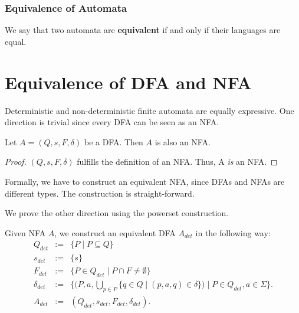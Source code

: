 

%


\subsubsection{Equivalence of Automata}
\begin{definition}
    We say that two automata are \textbf{equivalent} if and only if their languages are equal.
\end{definition}

\section{Equivalence of DFA and NFA}
 
Deterministic and non-deterministic finite automata are equally expressive. 
One direction is trivial since every DFA can be seen as an NFA. 

\begin{theorem}
    \label{dfa_to_nfa}
    Let $A=(Q,s,F,\delta)$ be a DFA. Then $A$ is also an NFA.
\end{theorem}
\begin{proof}
    $(Q,s,F,\delta)$ fulfills the definition of an NFA. Thus, A \textit{is} an NFA.
\end{proof}

Formally, we have to construct an equivalent NFA, since DFAs and NFAs are different types.
The construction is straight-forward.

We prove the other direction using the powerset construction. 

\begin{definition}
Given NFA $A$, we construct an equivalent DFA $A_{det}$ in the following way:
\begin{eqnarray*}
    Q_{det} & := & \{P \; | \; P \subseteq Q\} \\
    {s}_{det} & := & \{ s \} \\
    F_{det} & := & \{ P \in Q_{det} \; | \; P \cap F \neq \emptyset \} \\
    \delta_{det} & := & \{ (P,a,\bigcup \limits _{p \in P} \{ q \in Q \; | \; (p,a,q) \in \delta \}) \; | \; P \in Q_{det}, a \in \Sigma \}.     \\
    A_{det} &:=&  (Q_{det}, s_{det}, F_{det}, \delta_{det}).
\end{eqnarray*}
\end{definition}

